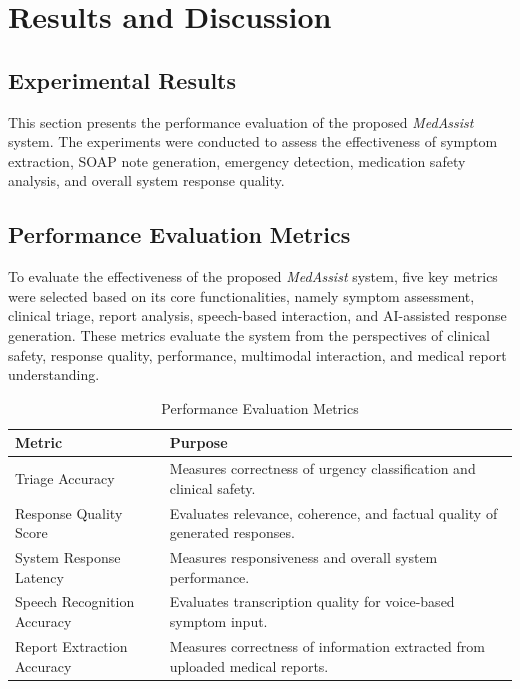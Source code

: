 \documentclass[conference]{IEEEtran}
\begin{document}
\section{Results and Discussion}

\subsection{Experimental Results}

This section presents the performance evaluation of the proposed \textit{MedAssist} system. The experiments were conducted to assess the effectiveness of symptom extraction, SOAP note generation, emergency detection, medication safety analysis, and overall system response quality.
\subsection{Performance Evaluation Metrics}

To evaluate the effectiveness of the proposed \textit{MedAssist} system, five key metrics were selected based on its core functionalities, namely symptom assessment, clinical triage, report analysis, speech-based interaction, and AI-assisted response generation. These metrics evaluate the system from the perspectives of clinical safety, response quality, performance, multimodal interaction, and medical report understanding.

\begin{table}[ht]
\centering
\caption{Performance Evaluation Metrics}
\label{tab:evaluation_metrics}
\footnotesize
\renewcommand{\arraystretch}{1.15}
\begin{tabular}{|>{\raggedright\arraybackslash}p{}|>{\raggedright\arraybackslash}p{}|}
\hline
\textbf{Metric} & \textbf{Purpose} \\
\hline
Triage Accuracy & Measures correctness of urgency classification and clinical safety. \\
\hline
Response Quality Score & Evaluates relevance, coherence, and factual quality of generated responses. \\
\hline
System Response Latency & Measures responsiveness and overall system performance. \\
\hline
Speech Recognition Accuracy & Evaluates transcription quality for voice-based symptom input. \\
\hline
Report Extraction Accuracy & Measures correctness of information extracted from uploaded medical reports. \\
\hline
\end{tabular}
\end{table}
\end{document}
